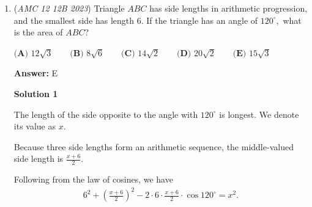 \begin{enumerate}
            \begin{itemize}
        \item Note: Chicken McNugget Theorem: any positive integer N= (a-1)(b-1)+t ( a,b co-prime, t>=0) can always be represented as N = aP+ bQ ( p,q are non-negative integer)
            \end{itemize}
            NOTE (by Mqoi\_KOLA)- this method isn't true in general for any three coprime numbers take for example $10,14,3$ from the method used here one get $49$ as the largest possible number which can't be achieved which is false because $49 = 10(2) + 14 + 3(5)$. The actual answer for $10, 14, 3$ is $11$.

 



\textbf{Solution 6 (EXTREME PREREQUISITE KNOWLEDGE)}

If you have knowledge about numerical semigroups, this problem is simply asking to find the Frobenius number of $S(n)=<6,10,15>$. We can find this by first finding the Apery set of the semigroup and subtracting $6$, from the largest element of the Apery set. $Ap(6,n)=<0,10,15,20,25,35>$. Thus $F(s)=35-6=29$. The answer is therefore $2+9=\boxed{11}$.~jamespudi

 \textbf{Note} This is the exact same question as the 2024 Mathcounts State Team Round question 4, albeit that this question asks for the sum of the digits of the number that cannot be formed.

 -i\_like\_food

 


	\item (\textit{AMC 12 12B 2023}) Triangle $ABC$ has side lengths in arithmetic progression, and the smallest side has length $6$. If the triangle has an angle of $120^\circ,$ what is the area of $ABC$?


 $\textbf{(A) }12\sqrt{3}\qquad\textbf{(B) }8\sqrt{6}\qquad\textbf{(C) }14\sqrt{2}\qquad\textbf{(D) }20\sqrt{2}\qquad\textbf{(E) }15\sqrt{3}$

 \textbf{Answer: }E



\textbf{Solution 1}

The length of the side opposite to the angle with $120^\circ$ is longest. We denote its value as $x$.

 Because three side lengths form an arithmetic sequence, the middle-valued side length is $\frac{x + 6}{2}$.

 Following from the law of cosines, we have
 \begin{align*} 6^2 + \left( \frac{x + 6}{2} \right)^2  - 2 \cdot 6 \cdot \frac{x + 6}{2} \cdot \cos 120^\circ = x^2 . \end{align*}



\end{enumerate}
